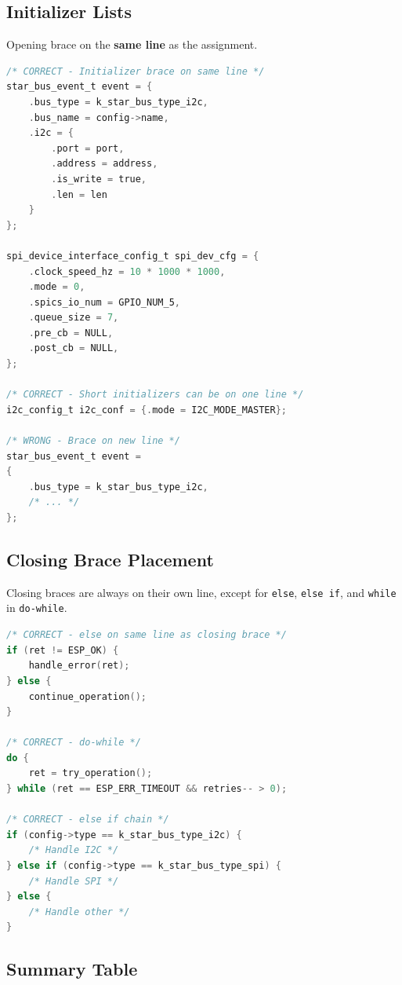 \subsection{Initializer Lists}

Opening brace on the \textbf{same line} as the assignment.

\begin{lstlisting}[language=C]
/* CORRECT - Initializer brace on same line */
star_bus_event_t event = {
    .bus_type = k_star_bus_type_i2c,
    .bus_name = config->name,
    .i2c = {
        .port = port,
        .address = address,
        .is_write = true,
        .len = len
    }
};

spi_device_interface_config_t spi_dev_cfg = {
    .clock_speed_hz = 10 * 1000 * 1000,
    .mode = 0,
    .spics_io_num = GPIO_NUM_5,
    .queue_size = 7,
    .pre_cb = NULL,
    .post_cb = NULL,
};

/* CORRECT - Short initializers can be on one line */
i2c_config_t i2c_conf = {.mode = I2C_MODE_MASTER};

/* WRONG - Brace on new line */
star_bus_event_t event =
{
    .bus_type = k_star_bus_type_i2c,
    /* ... */
};
\end{lstlisting}

\subsection{Closing Brace Placement}

Closing braces are always on their own line, except for \texttt{else}, \texttt{else if}, and \texttt{while} in \texttt{do-while}.

\begin{lstlisting}[language=C]
/* CORRECT - else on same line as closing brace */
if (ret != ESP_OK) {
    handle_error(ret);
} else {
    continue_operation();
}

/* CORRECT - do-while */
do {
    ret = try_operation();
} while (ret == ESP_ERR_TIMEOUT && retries-- > 0);

/* CORRECT - else if chain */
if (config->type == k_star_bus_type_i2c) {
    /* Handle I2C */
} else if (config->type == k_star_bus_type_spi) {
    /* Handle SPI */
} else {
    /* Handle other */
}
\end{lstlisting}

\subsection{Summary Table}


